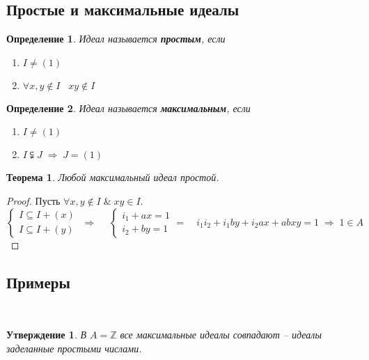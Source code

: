 \documentclass[12pt, a4paper]{article}
\newcommand{\ra}{\;\Rightarrow\;}
\newcommand{\Z}{\mathds{Z}}
\theoremstyle{plain}
\newtheorem*{Th*}{Теорема}
\newtheorem{Def}{Определение}
\newtheorem*{Statement*}{Утверждение}
\theoremstyle{definition}
\begin{document}
\subsection*{Простые и максимальные идеалы}
\begin{Def}
    Идеал называется \textbf{простым}, если 
    \begin{enumerate}
        \item $I\neq(1)$
        \item $\forall x,y\notin I\;\;\; xy\notin I$
    \end{enumerate}
\end{Def}
\begin{Def}
    Идеал называется \textbf{максимальным}, если 
    \begin{enumerate}
        \item $I\neq(1)$
        \item $I\subsetneqq J\ra J=(1)$
    \end{enumerate}
\end{Def}
\begin{Th*}
    Любой максимальный идеал простой.
\end{Th*}
\begin{proof}
    Пусть $\forall x,y\notin I\;\&\; xy\in I$.\\
 \begin{equation*}   
    \begin{cases}
        I\subseteq I+(x)\\
        I\subseteq I+(y)
    \end{cases}
    \ra\quad
    \begin{cases}
        i_1+ax = 1\\
    i_2+by = 1
    \end{cases}
    =\quad i_1i_2+i_1by+i_2ax+abxy = 1 \ra 1\in A
\end{equation*}   
\end{proof}
\subsection*{Примеры}\
\begin{Statement*}
    В $A = \Z$ все максимальные идеалы совпадают -- идеалы заделанные простыми числами.
\end{Statement*}
\end{document}
